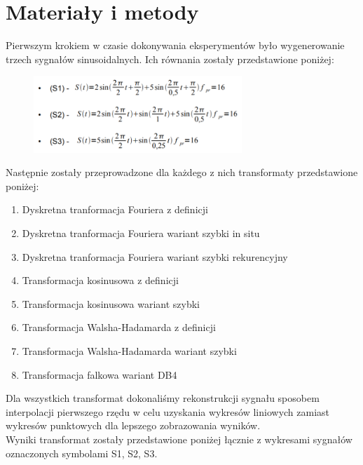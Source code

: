 \documentclass[12pt]{article}
\begin{document}
    \section{Materiały i metody} {
        Pierwszym krokiem w czasie dokonywania eksperymentów było wygenerowanie trzech sygnałów
        sinusoidalnych. Ich równania zostały przedstawione poniżej:
        \begin{figure}[H]
            \label{wzory}
            \centering
            \includegraphics[width=0.7\textwidth]{img/theory/equations.png}
        \end{figure}
        Następnie zostały przeprowadzone dla każdego z nich transformaty przedstawione poniżej:
        \begin{enumerate}
            \item Dyskretna tranformacja Fouriera z definicji
            \item Dyskretna tranformacja Fouriera wariant szybki in situ
            \item Dyskretna tranformacja Fouriera wariant szybki rekurencyjny
            \item Transformacja kosinusowa z definicji
            \item Transformacja kosinusowa wariant szybki
            \item Transformacja Walsha-Hadamarda z definicji
            \item Transformacja Walsha-Hadamarda wariant szybki
            \item Transformacja falkowa wariant DB4
        \end{enumerate}

        Dla wszystkich transformat dokonaliśmy rekonstrukcji sygnału
        sposobem interpolacji pierwszego rzędu w celu uzyskania
        wykresów liniowych zamiast wykresów punktowych dla lepszego
        zobrazowania wyników.\\

        Wyniki transformat zostały przedstawione poniżej łącznie z wykresami sygnałów oznaczonych
        symbolami S1, S2, S3. 
    }
    \newpage
\end{document}
